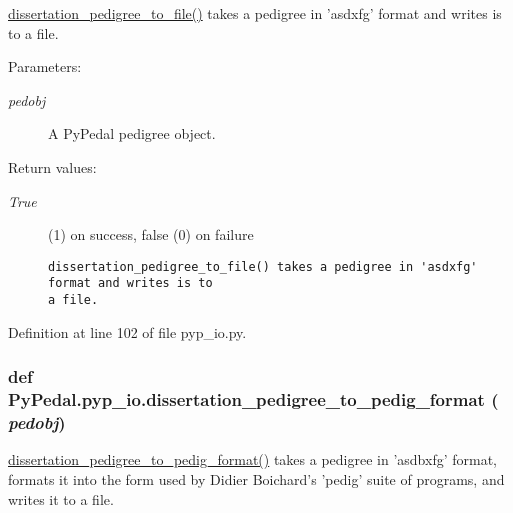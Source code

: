 \hyperlink{namespacePyPedal_1_1pyp__io_bf331c3be82531c8de2e408951d2001b}{dissertation\_\-pedigree\_\-to\_\-file()} takes a pedigree in 'asdxfg' format and writes is to a file. 

\begin{Desc}
\item[Parameters:]
\begin{description}
\item[{\em pedobj}]A Py\-Pedal pedigree object. \end{description}
\end{Desc}
\begin{Desc}
\item[Return values:]
\begin{description}
\item[{\em True}](1) on success, false (0) on failure

\footnotesize\begin{verbatim}dissertation_pedigree_to_file() takes a pedigree in 'asdxfg' format and writes is to
a file.
\end{verbatim}
\normalsize
 \end{description}
\end{Desc}


Definition at line 102 of file pyp\_\-io.py.\hypertarget{namespacePyPedal_1_1pyp__io_65f88cf8cb03f8633403511e20b664a1}{
\subsubsection[dissertation\_\-pedigree\_\-to\_\-pedig\_\-format]{\setlength{\rightskip}{0pt plus 5cm}def Py\-Pedal.pyp\_\-io.dissertation\_\-pedigree\_\-to\_\-pedig\_\-format ( {\em pedobj})}}
\label{namespacePyPedal_1_1pyp__io_65f88cf8cb03f8633403511e20b664a1}


\hyperlink{namespacePyPedal_1_1pyp__io_65f88cf8cb03f8633403511e20b664a1}{dissertation\_\-pedigree\_\-to\_\-pedig\_\-format()} takes a pedigree in 'asdbxfg' format, formats it into the form used by Didier Boichard's 'pedig' suite of programs, and writes it to a file. 

